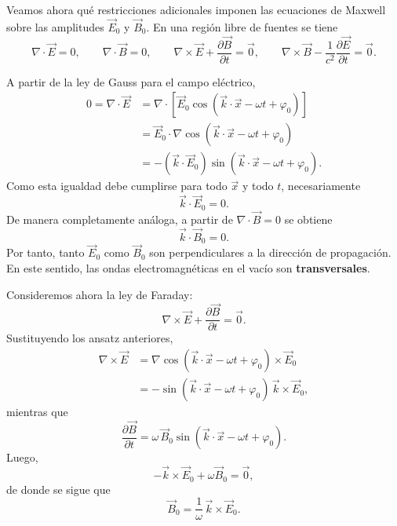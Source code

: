 \documentclass[12pt,a4paper]{article}
\theoremstyle{definition}
\theoremstyle{plain}
\numberwithin{equation}{section}
\theoremstyle{remark}
\newcommand{\E}{\vec{E}}
\newcommand{\B}{\vec{B}}
\newcommand{\rot}{\nabla\times}
\newcommand{\diver}{\nabla\cdot}
\begin{document}
Veamos ahora qué restricciones adicionales imponen las ecuaciones de Maxwell sobre las amplitudes $\vec E_0$ y $\vec B_0$. En una región libre de fuentes se tiene
\begin{equation*}
    \diver \E=0,
    \qquad
    \diver \B=0,
    \qquad
    \rot \E+\frac{\partial \B}{\partial t}=\vec 0,
    \qquad
    \rot \B-\frac{1}{c^2}\frac{\partial \E}{\partial t}=\vec 0.
\end{equation*}

A partir de la ley de Gauss para el campo eléctrico,
\begin{align*}
    0
    =\diver \E
    &=\diver\left[\vec E_0\cos\left(\vec k\cdot\vec x-\omega t+\varphi_0\right)\right] \\
    &=\vec E_0\cdot\nabla\cos\left(\vec k\cdot\vec x-\omega t+\varphi_0\right) \\
    &=-(\vec k\cdot\vec E_0)\sin\left(\vec k\cdot\vec x-\omega t+\varphi_0\right).
\end{align*}
Como esta igualdad debe cumplirse para todo $\vec x$ y todo $t$, necesariamente
\begin{equation*}
    \vec k\cdot \vec E_0=0.
\end{equation*}
De manera completamente análoga, a partir de $\diver \B=0$ se obtiene
\begin{equation*}
    \vec k\cdot \vec B_0=0.
\end{equation*}
Por tanto, tanto $\vec E_0$ como $\vec B_0$ son perpendiculares a la dirección de propagación. En este sentido, las ondas electromagnéticas en el vacío son \textbf{transversales}.

Consideremos ahora la ley de Faraday:
\begin{equation*}
    \rot \E+\frac{\partial \B}{\partial t}=\vec 0.
\end{equation*}
Sustituyendo los ansatz anteriores,
\begin{align*}
    \rot \E
    &= \nabla\cos\left(\vec k\cdot\vec x-\omega t+\varphi_0\right)\times \vec E_0 \\
    &= -\sin\left(\vec k\cdot\vec x-\omega t+\varphi_0\right)\,\vec k\times \vec E_0,
\end{align*}
mientras que
\begin{equation*}
    \frac{\partial \B}{\partial t}
    = \omega\,\vec B_0\sin\left(\vec k\cdot\vec x-\omega t+\varphi_0\right).
\end{equation*}
Luego,
\begin{equation*}
    -\vec k\times \vec E_0+\omega \vec B_0=\vec 0,
\end{equation*}
de donde se sigue que
\begin{equation*}
    \vec B_0=\frac{1}{\omega}\,\vec k\times \vec E_0.
\end{equation*}
\end{document}
